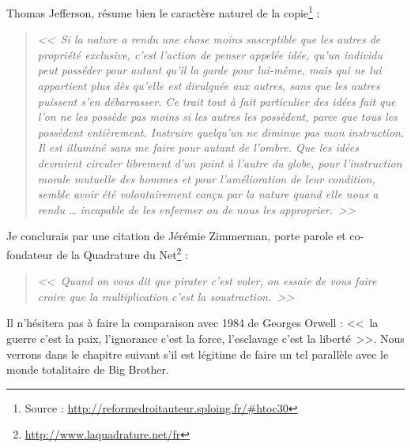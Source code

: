 Thomas Jefferson, résume bien le caractère naturel de la copie\footnote{Source : \url{http://reformedroitauteur.sploing.fr/\#htoc30}} :

\begin{quotation}
\begin{flushright}
\textit{<<~Si la nature a rendu une chose moins susceptible que les autres de propriété exclusive, c'est l'action de penser appelée idée, qu'un individu peut posséder pour autant qu'il la garde pour lui-même, mais qui ne lui appartient plus dès qu'elle est divulguée aux autres, sans que les autres puissent s'en débarrasser.
Ce trait tout à fait particulier des idées fait que l'on ne les possède pas moins si les autres les possèdent, parce que tous les possèdent entièrement.
Instruire quelqu'un ne diminue pas mon instruction.
Il est illuminé sans me faire pour autant de l'ombre.
Que les idées devraient circuler librement d'un point à l'autre du globe, pour l'instruction morale mutuelle des hommes et pour l'amélioration de leur condition, semble avoir été volontairement conçu par la nature quand elle nous a rendu \dots{} incapable de les enfermer ou de nous les approprier.~>>}
\end{flushright}
\end{quotation}

Je conclurais par une citation de Jérémie Zimmerman, porte parole et co-fondateur de la Quadrature du Net\footnote{\url{http://www.laquadrature.net/fr}} :

\begin{quote}
\textit{{\Large <<~Quand on vous dit que pirater c'est voler, on essaie de vous faire croire que la multiplication c'est la soustraction.~>>}}
\end{quote}

Il n'hésitera pas à faire la comparaison avec 1984 de Georges Orwell : <<~la guerre c'est la paix, l'ignorance c'est la force, l'esclavage c'est la liberté~>>.
Nous verrons dans le chapitre suivant s'il est légitime de faire un tel parallèle avec le monde totalitaire de Big Brother.

